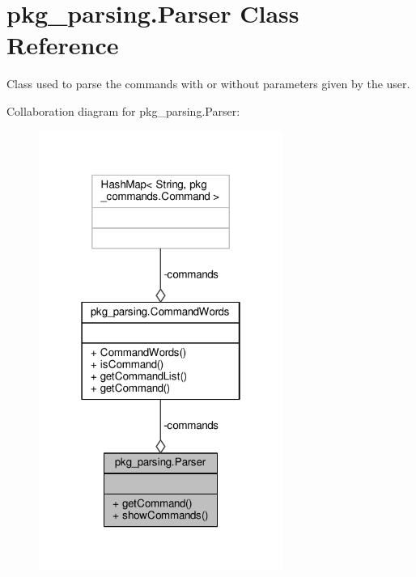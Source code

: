 \hypertarget{classpkg__parsing_1_1Parser}{\section{pkg\-\_\-parsing.\-Parser Class Reference}
\label{classpkg__parsing_1_1Parser}
}


Class used to parse the commands with or without parameters given by the user.  




Collaboration diagram for pkg\-\_\-parsing.\-Parser\-:\nopagebreak
\begin{figure}[H]
\begin{center}
\leavevmode
\includegraphics[width=226pt]{classpkg__parsing_1_1Parser__coll__graph}
\end{center}
\end{figure}
